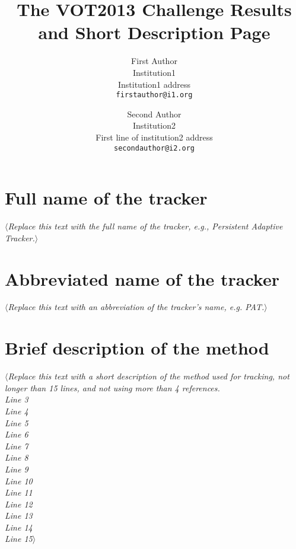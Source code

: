 \documentclass[10pt,oneside]{article}
\date{}
\begin{document}
\title{The VOT2013 Challenge Results and Short Description Page}

\author{First Author\\
Institution1\\
Institution1 address\\
{\tt\small firstauthor@i1.org}
\and
Second Author\\
Institution2\\
First line of institution2 address\\
{\tt\small secondauthor@i2.org}
}

\newcommand{\replace}[1]{$\langle$\textit{#1}$\rangle$}

\maketitle

\section{Full name of the tracker} 
\replace{Replace this text with the full name of the tracker, e.g., Persistent Adaptive Tracker.}

\section{Abbreviated name of the tracker}
\replace{Replace this text with an abbreviation of the tracker's name, e.g. PAT.}

\section{Brief description of the method}
\replace{Replace this text with a short description of the method used for tracking, not longer than 15 lines,
and not using more than 4 references.\\
Line 3 \\
Line 4 \\
Line 5 \\
Line 6 \\
Line 7 \\
Line 8 \\
Line 9 \\
Line 10\\
Line 11\\
Line 12\\
Line 13\\
Line 14\\
Line 15}
\end{document}
